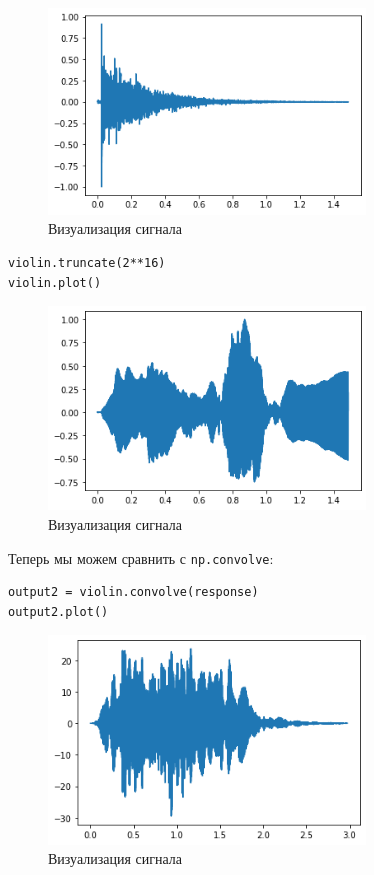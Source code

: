 \documentclass[a4paper,12pt]{report}
\begin{document}
\begin{figure}[H]
        \centering
        \includegraphics[width=0.75\textwidth]{lab10_fig1_5.png}
        \caption{Визуализация сигнала}
        \label{fig:lab10_fig1_5}
\end{figure}

\begin{lstlisting}[caption=Избавление от нулевого отступа]
violin.truncate(2**16)
violin.plot()
\end{lstlisting}

\begin{figure}[H]
        \centering
        \includegraphics[width=0.75\textwidth]{lab10_fig1_6.png}
        \caption{Визуализация сигнала}
        \label{fig:lab10_fig1_6}
\end{figure}

Теперь мы можем сравнить с \texttt{np.convolve}:

\begin{lstlisting}[caption=Объединение сигналов]
output2 = violin.convolve(response)
output2.plot()
\end{lstlisting}

\begin{figure}[H]
        \centering
        \includegraphics[width=0.75\textwidth]{lab10_fig1_7.png}
        \caption{Визуализация сигнала}
        \label{fig:lab10_fig1_7}
\end{figure}
\end{document}
